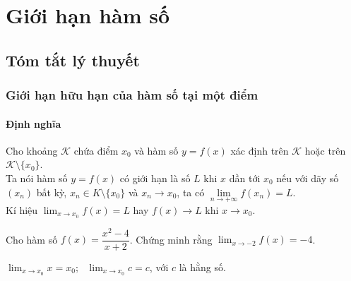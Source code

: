 \section{Giới hạn hàm số}
\subsection{Tóm tắt lý thuyết}
\subsubsection{Giới hạn hữu hạn của hàm số tại một điểm}
\paragraph{Định nghĩa}
\begin{dn}
Cho khoảng $\mathscr{K}$ chứa điểm $x_0$ và hàm số $y=f(x)$ xác định trên $\mathscr{K}$ hoặc trên $\mathscr{K}\setminus \{x_0\}$.\\
Ta nói hàm số $y = f(x)$ có giới hạn là số $L$ khi $x$ dần tới $x_0$ nếu với dãy số $(x_n)$ bất kỳ, $x_n\in K\setminus \{x_0\}$ và $x_n\to x_0$, ta có $\displaystyle\lim \limits_{n \to +\infty}f(x_n)=L$.\\
Kí hiệu $\displaystyle\lim_{x\to x_0} f(x)=L$ hay $f(x)\rightarrow L$ khi $x \rightarrow x_0$.
\end{dn}
\begin{vd}%
Cho hàm số $f(x) = \dfrac{x^2 - 4}{x + 2}$. Chứng minh rằng $\displaystyle\lim_{x\to -2} f(x)= -4$.
\end{vd}
\begin{note}
$\displaystyle \lim_{x \to x_0}x = x_0; \text{ }\displaystyle \lim_{x \to x_0} c = c$, với $c$ là hằng số. 
\end{note}

